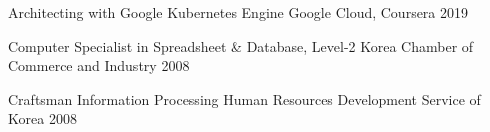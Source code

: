 

\begin{cvhonors}

  \cvhonor
    {Architecting with Google Kubernetes Engine} %
    {Google Cloud, Coursera} %
    {} %
    {2019} %

  \cvhonor
    {Computer Specialist in Spreadsheet \& Database, Level-2} %
    {Korea Chamber of Commerce and Industry} %
    {} %
    {2008} %

  \cvhonor
    {Craftsman Information Processing} %
    {Human Resources Development Service of Korea} %
    {} %
    {2008} %

\end{cvhonors}
